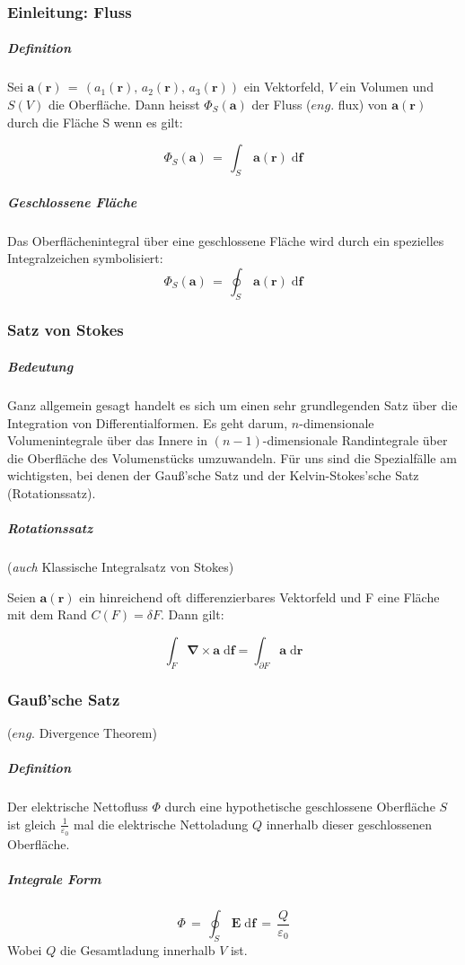 \documentclass[titlepage,11pt,a4paper,ngerman]{report}
\renewcommand{\vec}[1]{\boldsymbol{#1}}
\renewcommand{\epsilon}{\varepsilon}
\newcommand{\vabla}{\boldsymbol{\nabla}}
\renewcommand{\paragraph}[1]{\subsubsection{#1}}
\begin{document}
\paragraph{Einleitung: Fluss}
\subparagraph{Definition}
Sei $\vec{a}(\vec{r})\,=\,(a_1(\vec{r}),\,a_2(\vec{r}),\, a_3(\vec{r}))$ ein Vektorfeld, $V$ ein Volumen und $S(V)$ die Oberfläche. Dann heisst $\Phi_S(\vec{a})$ der Fluss ($eng.$ flux) von $\vec{a}(\vec{r})$ durch die Fläche S wenn es gilt:

\[\Phi_S(\vec{a})\,=\,\int_{S}\,\vec{a}(\vec{r})\;\mathrm{d}\vec{f}\]

\subparagraph{Geschlossene Fläche} Das Oberflächenintegral über eine geschlossene Fläche wird durch ein spezielles Integralzeichen symbolisiert:
\[\Phi_S(\vec{a})\,=\,\oint_S\,\vec{a}(\vec{r})\;\mathrm{d}\vec{f}\]

\paragraph{Satz von Stokes}
\subparagraph{Bedeutung}
Ganz allgemein gesagt handelt es sich um einen sehr grundlegenden Satz über die Integration von Differentialformen. Es geht darum, $n$-dimensionale Volumenintegrale über das Innere in $(n-1)$-dimensionale Randintegrale über die Oberfläche des Volumenstücks umzuwandeln. Für uns sind die Spezialfälle am wichtigsten, bei denen der Gauß'sche Satz und der Kelvin-Stokes'sche Satz (Rotationssatz).

\subparagraph{Rotationssatz} (\textit{auch} Klassische Integralsatz von Stokes) \hfill \break

Seien $\vec{a}(\vec{r})$ ein hinreichend oft differenzierbares Vektorfeld und F eine Fläche mit dem Rand $C(F) = \delta F$. Dann gilt:

$$\int_{F} \vabla \times \vec{a}\; \mathrm{d}\vec{f} = \int_{\partial F}\vec{a}\; \mathrm{d}\vec{r}$$

\paragraph{Gauß'sche Satz}
($eng.$ Divergence Theorem)

\subparagraph{Definition} Der elektrische Nettofluss $\Phi$ durch eine hypothetische geschlossene Oberfläche $S$ ist gleich $\frac{1}{\epsilon_0}$ mal die elektrische Nettoladung $Q$ innerhalb dieser geschlossenen Oberfläche.

\subparagraph{Integrale Form}
\[\Phi\,=\,\oint_S\, \vec{E}\; \mathrm{d}\vec{f}\,=\,\frac{Q}{\epsilon_0}\]
Wobei $Q$ die Gesamtladung innerhalb $V$ ist.
\end{document}
